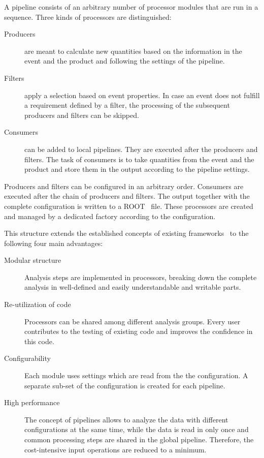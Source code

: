 \documentclass[3p]{elsarticle}
\begin{document}
A pipeline consists of an arbitrary number of processor modules that are run in a sequence.
Three kinds of processors are distinguished:
\begin{description}
\item[Producers] are meant to calculate new quantities based on the information in the event and the product and following the settings of the pipeline.
\item[Filters] apply a selection based on event properties.
In case an event does not fulfill a requirement defined by a filter, the processing of the subsequent producers and filters can be skipped.
\item[Consumers] can be added to local pipelines.
They are executed after the producers and filters.
The task of consumers is to take quantities from the event and the product and store them in the output according to the pipeline settings.
\end{description}
Producers and filters can be configured in an arbitrary order.
Consumers are executed after the chain of producers and filters.
The output together with the complete configuration is written to a ROOT~\cite{root} file.
These processors are created and managed by a dedicated factory according to the configuration.

This structure extends the established concepts of existing frameworks~\cite{cmssw} to the following four main advantages:
\begin{description}
\item[Modular structure] Analysis steps are implemented in processors, breaking down the complete analysis in well-defined and easily understandable and writable parts.
\item[Re-utilization of code] Processors can be shared among different analysis groups.
Every user contributes to the testing of existing code and improves the confidence in this code.
\item[Configurability] Each module uses settings which are read from the the configuration.
A separate sub-set of the configuration is created for each pipeline.
\item[High performance] The concept of pipelines allows to analyze the data with different configurations at the same time, while the data is read in only once and common processing steps are shared in the global pipeline.
Therefore, the cost-intensive input operations are reduced to a minimum.
\end{description}
\end{document}
